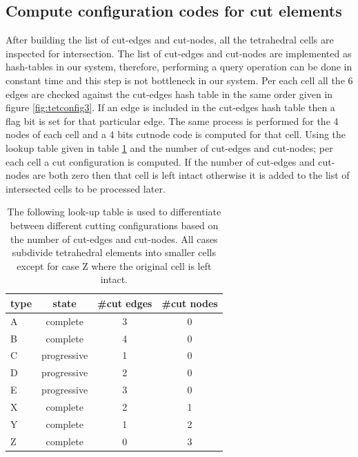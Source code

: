 \subsection{Compute configuration codes for cut elements}
\label{sec:cutconfigs}
After building the list of cut-edges and cut-nodes, all the tetrahedral cells are inspected for intersection. 
The list of cut-edges and cut-nodes are implemented as hash-tables in our system, therefore, performing a query operation can be done 
in constant time and this step is not bottleneck in our system. Per each cell all the 6 edges are checked against the cut-edges hash table 
in the same order given in figure \ref{fig:tetconfig3}. If an edge is included in the cut-edges hash table then a flag bit is set for that
particular edge. The same process is performed for the 4 nodes of each cell and a 4 bits cutnode code is computed for that cell.
Using the lookup table given in table \ref{table:allcutconfigs} and the number of cut-edges and cut-nodes; per each cell a cut configuration
is computed.  If the number of cut-edges and cut-nodes are both zero then that cell is left intact otherwise it is added to the list of intersected cells
to be processed later.

\begin{table}[H]
\begin{center}
\caption{\label{table:allcutconfigs}{The following look-up table is used to differentiate between different cutting configurations based on
the number of cut-edges and cut-nodes. All cases subdivide tetrahedral elements into smaller cells except for case Z where the original
cell is left intact.}}
  \begin{tabular}{ | l | c | c | c | }
    \hline    
    type & state & \#cut edges & \#cut nodes \\ \hline \hline    
    A & complete & 3 & 0 \\ \hline
    B & complete & 4 & 0 \\ \hline
    C & progressive & 1 & 0 \\ \hline
    D & progressive & 2 & 0 \\ \hline
    E & progressive & 3 & 0 \\ \hline
    X & complete & 2 & 1 \\ \hline
    Y & complete & 1 & 2 \\ \hline
    Z & complete & 0 & 3 \\ \hline
    \hline
  \end{tabular}
\end{center}
\end{table}

